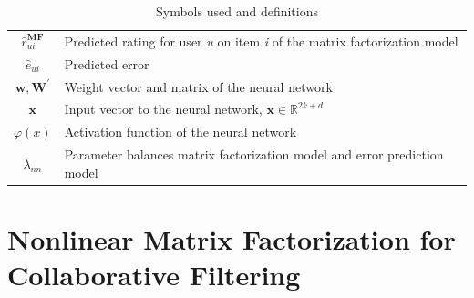 \begin{table}[p]
\begin{center}
\begin{tabularx}{0.9\linewidth}{cX}
			$\mathit{\hat{r}_{ui}^\mathbf{MF}}$ & Predicted rating for user \textit{u} on item \textit{i} of the matrix factorization model \\
			$\hat{e}_{ui}$ & Predicted error\\
			$\mathbf{w}, \mathbf{W^\prime}$ & Weight vector and matrix of the neural network \\
			$\mathbf{x}$ & Input vector to the neural network, $\mathbf{x} \in \mathds{R}^{2k + d}$ \\
			$\varphi(x)$ & Activation function of the neural network \\
			$\lambda_{nn}$ & Parameter balances matrix factorization model and error prediction model \\
			\hline \hline
		\end{tabularx}
	\end{center}
	\caption{Symbols used and definitions}
	\label{tab:symbols}
\end{table}

\section{Nonlinear Matrix Factorization for Collaborative Filtering}
\label{st:mpcf}


